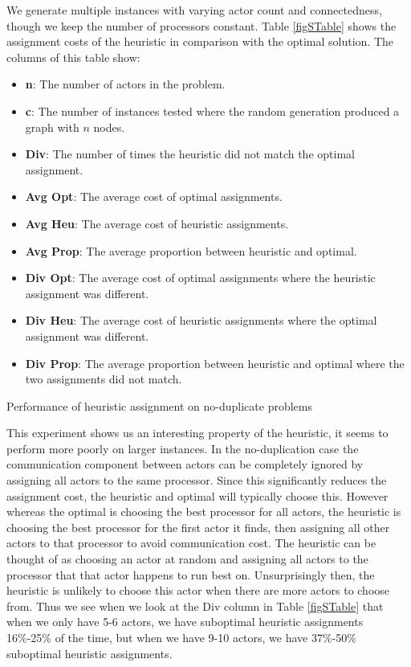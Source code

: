 We generate multiple instances with varying actor count and connectedness, though we keep the number of processors constant.
Table \ref{figSTable} shows the assignment costs of the heuristic in comparison with the optimal solution.
The columns of this table show:
\begin{itemize}
	\item {\bf n}: The number of actors in the problem.
	\item {\bf c}: The number of instances tested where the random generation produced a graph with $n$ nodes.
	\item {\bf Div}: The number of times the heuristic did not match the optimal assignment.
	\item {\bf Avg Opt}: The average cost of optimal assignments.
	\item {\bf Avg Heu}: The average cost of heuristic assignments.
	\item {\bf Avg Prop}: The average proportion between heuristic and optimal.
	\item {\bf Div Opt}: The average cost of optimal assignments where the heuristic assignment was different.
	\item {\bf Div Heu}: The average cost of heuristic assignments where the optimal assignment was different.
	\item {\bf Div Prop}: The average proportion between heuristic and optimal where the two assignments did not match.
\end{itemize}

\begin{table}
\begin{center}
	
\caption{Performance of heuristic assignment on no-duplicate problems}
\label{figSTable}
\end{center}
\end{table}

This experiment shows us an interesting property of the heuristic, it seems to perform more poorly on larger instances.
In the no-duplication case the communication component between actors can be completely ignored by assigning all actors to the same processor.
Since this significantly reduces the assignment cost, the heuristic and optimal will typically choose this.
However whereas the optimal is choosing the best processor for all actors, the heuristic is choosing the best processor for the first actor it finds, then assigning all other actors to that processor to avoid communication cost.
The heuristic can be thought of as choosing an actor at random and assigning all actors to the processor that that actor happens to run best on.
Unsurprisingly then, the heuristic is unlikely to choose this actor when there are more actors to choose from.
Thus we see when we look at the Div column in Table \ref{figSTable} that when we only have 5-6 actors, we have suboptimal heuristic assignments 16\%-25\% of the time, but when we have 9-10 actors, we have 37\%-50\% suboptimal heuristic assignments.

